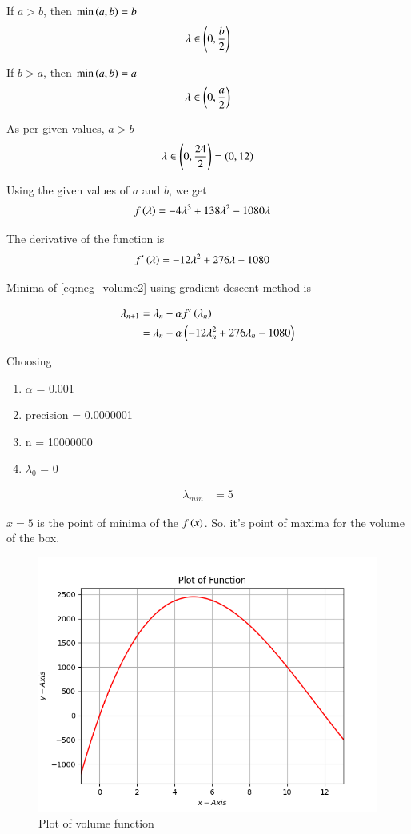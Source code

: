 \documentclass[journal,12pt,twocolumn]{IEEEtran}
\begin{document}
If $a > b$, then $\min\left(a,b\right) = b$ 
\begin{align}
    \lambda \in \left(0, \frac{b}{2}\right)
\end{align}

If $b > a$, then $\min\left(a,b\right) = a$
\begin{align}
    \lambda \in \left(0, \frac{a}{2}\right)
\end{align}

As per given values, $a>b$
\begin{align}
    \lambda \in \left(0, \frac{24}{2}\right) = \left(0, 12\right)
\end{align}

Using the given values of $a$ and $b$, we get
\begin{align}
    \label{eq:neg_volume2}
    f\left(\lambda\right) &= -4\lambda^3 + 138\lambda^2 - 1080\lambda
\end{align}

The derivative of the function is
\begin{align}
    f^\prime\left(\lambda\right) &= -12\lambda^2 + 276\lambda - 1080 
\end{align}

Minima of \eqref{eq:neg_volume2} using gradient descent method is

\begin{align}
	\lambda_{n+1} &= \lambda_n - \alpha f^\prime\left(\lambda_n\right)\\
    \label{eq:grad_dec/eq1}
    &= \lambda_n - \alpha \left(-12\lambda_n^2 + 276\lambda_n - 1080\right)\\
\end{align}

Choosing
\begin{enumerate}
 \item $\alpha$ = 0.001
 \item precision = 0.0000001
 \item n = 10000000 
 \item $\lambda_0$ = 0
\end{enumerate}

\begin{align}
    \lambda_{min} &= 5
\end{align}

$x=5$ is the point of minima of the $f\left(x\right)$.
So, it's point of maxima for the volume of the box.

\begin{figure}[!htb]
    \centering
    \includegraphics[width=\columnwidth]{figs/plot.png}
    \caption{Plot of volume function}
    \label{fig:plot of function}
\end{figure}
\end{document}
